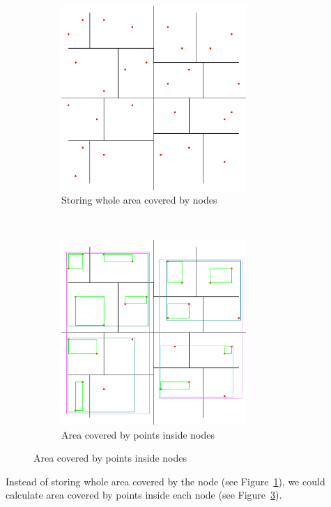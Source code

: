 \documentclass[10pt,a4paper]{article}
\begin{document}
\begin{figure}[h!]
        \centering
        \begin{subfigure}[b]{0.42\textwidth}
                \centering
                \includegraphics[width=7cm]{Figure1}
      		\caption{Storing whole area covered by nodes}
  				\label{fig:covered}
        \end{subfigure}%
        \qquad\qquad
        ~ %
        \begin{subfigure}[b]{0.42\textwidth}
                \centering
 				\includegraphics[width=7cm]{Figure2}
 				 \caption{Area covered by points inside nodes}
 				 \label{fig:inside}
        \end{subfigure}
        
\end{figure}

Instead of storing whole area covered by the node (see Figure~\ref{fig:covered}), we could calculate area covered by points inside each node (see Figure~\ref{fig:inside}).
\end{document}

